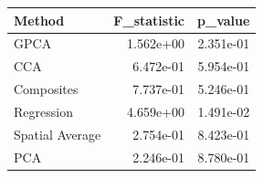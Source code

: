 \begin{tabular}{lrr}
\toprule
Method & F_statistic & p_value \\
\midrule
GPCA & 1.562e+00 & 2.351e-01 \\
CCA & 6.472e-01 & 5.954e-01 \\
Composites & 7.737e-01 & 5.246e-01 \\
Regression & 4.659e+00 & 1.491e-02 \\
Spatial Average & 2.754e-01 & 8.423e-01 \\
PCA & 2.246e-01 & 8.780e-01 \\
\bottomrule
\end{tabular}
